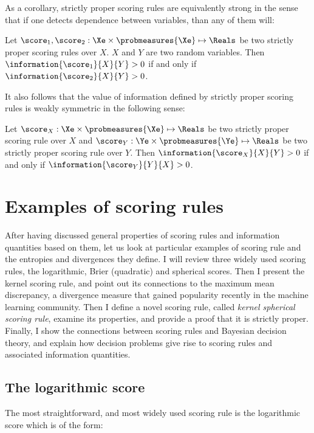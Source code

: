 As a corollary, strictly proper scoring rules are equivalently strong in the sense that if one detects dependence between variables, than any of them will:

\begin{corollary}
	Let $\score_1,\score_2:\Xe\times\probmeasures{\Xe}\mapsto\Reals$ be two strictly proper scoring rules over $X$. $X$ and $Y$ are two random variables. Then $\information{\score_1}{X}{Y} > 0$ if and only if $\information{\score_2}{X}{Y} > 0$.
\end{corollary}

It also follows that the value of information defined by strictly proper scoring rules is weakly symmetric in the following sense:

\begin{corollary}
	Let $\score_X:\Xe\times\probmeasures{\Xe}\mapsto\Reals$ be two strictly proper scoring rule over $X$ and $\score_Y:\Ye\times\probmeasures{\Ye}\mapsto\Reals$ be two strictly proper scoring rule over $Y$.  Then $\information{\score_X}{X}{Y} > 0$ if and only if $\information{\score_Y}{Y}{X} > 0$.
\end{corollary}

\section{Examples of scoring rules}

After having discussed general properties of scoring rules and information quantities based on them, let us look at particular examples of scoring rule and the entropies and divergences they define. I will review three widely used scoring rules, the logarithmic, Brier (quadratic) and spherical scores. Then I present the kernel scoring rule, and point out its connections to the maximum mean discrepancy, a divergence measure that gained popularity recently in the machine learning community. Then I define a novel scoring rule, called \emph{kernel spherical scoring rule}, examine its properties, and provide a proof that it is strictly proper. Finally, I show the connections between scoring rules and Bayesian decision theory, and explain how decision problems give rise to scoring rules and associated information quantities.

\subsection{The logarithmic score}

The most straightforward, and most widely used scoring rule is the logarithmic score which is of the form:


